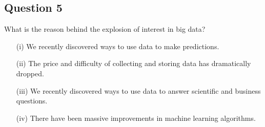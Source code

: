 \documentclass[12pt]{article}
\begin{document}
\subsection*{Question 5}
What is the reason behind the explosion of interest in big data?

\begin{itemize}
\item[(i)] We recently discovered ways to use data to make predictions.
\item[(ii)] The price and difficulty of collecting and storing data has dramatically dropped.
\item[(iii)] We recently discovered ways to use data to answer scientific and business questions.
\item[(iv)] There have been massive improvements in machine learning algorithms.
\end{itemize}
\end{document}
